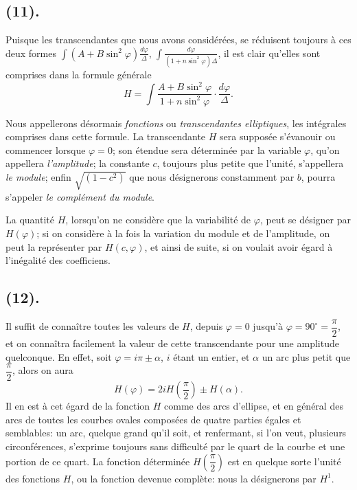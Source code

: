 \documentclass{article}
\begin{document}
\subsection*{(11).}

Puisque les transcendantes que nous avons considérées, se réduisent toujours à ces deux formes $\displaystyle\int(A+B\sin^{2}\varphi)\frac{d\varphi}{\Delta}$, $\displaystyle\int\frac{d\varphi}{(1+n\sin^{2}\varphi)\Delta}$, il est clair qu'elles sont comprises dans la formule générale
\[ H=\int\frac{A+B\sin^{2}\varphi}{1+n\sin^{2}\varphi}\cdot\frac{d\varphi}{\Delta}. \]

Nous appellerons désormais \emph{fonctions} ou \emph{transcendantes elliptiques}, les intégrales comprises dans cette formule. La transcendante $H$ sera supposée s'évanouir ou commencer lorsque $\varphi=0$; son étendue sera déterminée par la variable $\varphi$, qu'on appellera \emph{l'amplitude}; la constante $c$, toujours plus petite que l'unité, s'appellera \emph{le module}; enfin $\sqrt{(1-c^{2})}$ que nous désignerons constamment par $b$, pourra s'appeler \emph{le complément du module}.

La quantité $H$, lorsqu'on ne considère que la variabilité de $\varphi$, peut se désigner par $H(\varphi)$; si on considère à la fois la variation du module et de l'amplitude, on peut la représenter par $H(c,\varphi)$, et ainsi de suite, si on voulait avoir égard à l'inégalité des coefficiens.

\subsection*{(12).}

Il suffit de connaître toutes les valeurs de $H$, depuis $\varphi=0$ jusqu'à $\varphi=90^{\circ}=\dfrac{\pi}{2}$, et on connaîtra facilement la valeur de cette transcendante pour une amplitude quelconque. En effet, soit $\varphi=i\pi\pm\alpha$, $i$ étant un entier, et $\alpha$ un arc plus petit que $\dfrac{\pi}{2}$, alors on aura
\[ H(\varphi)=2iH\left(\frac{\pi}{2}\right)\pm H(\alpha). \]
Il en est à cet égard de la fonction $H$ comme des arcs d'ellipse, et en général des arcs de toutes les courbes ovales composées de quatre parties égales et semblables: un arc, quelque grand qu'il soit, et renfermant, si l'on veut, plusieurs circonférences, s'exprime toujours sans difficulté par le quart de la courbe et une portion de ce quart. La fonction déterminée $H\left(\dfrac{\pi}{2}\right)$ est en quelque sorte l'unité des fonctions $H$, ou la fonction devenue complète: nous la désignerons par $H^{1}$.
\end{document}
